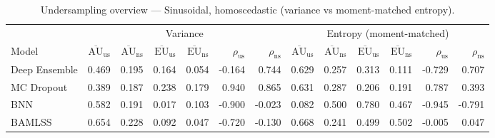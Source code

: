 \begin{table}[htbp]
\centering
\small
\caption{Undersampling overview --- Sinusoidal, homoscedastic (variance vs moment-matched entropy).}
\begin{tabular}{l*{12}{r}}
\toprule
 & \multicolumn{6}{c}{Variance} & \multicolumn{6}{c}{Entropy (moment-matched)} \\
\cmidrule(lr){2-7}\cmidrule(lr){8-13}
Model & $\overline{\mathrm{AU}}_{\mathrm{us}}$ & $\overline{\mathrm{AU}}_{\mathrm{ns}}$ & $\overline{\mathrm{EU}}_{\mathrm{us}}$ & $\overline{\mathrm{EU}}_{\mathrm{ns}}$ & $\rho_{\mathrm{us}}$ & $\rho_{\mathrm{ns}}$ & $\overline{\mathrm{AU}}_{\mathrm{us}}$ & $\overline{\mathrm{AU}}_{\mathrm{ns}}$ & $\overline{\mathrm{EU}}_{\mathrm{us}}$ & $\overline{\mathrm{EU}}_{\mathrm{ns}}$ & $\rho_{\mathrm{us}}$ & $\rho_{\mathrm{ns}}$ \\
\midrule
Deep Ensemble & 0.469 & 0.195 & 0.164 & 0.054 & -0.164 & 0.744 & 0.629 & 0.257 & 0.313 & 0.111 & -0.729 & 0.707 \\
MC Dropout & 0.389 & 0.187 & 0.238 & 0.179 & 0.940 & 0.865 & 0.631 & 0.287 & 0.206 & 0.191 & 0.787 & 0.393 \\
BNN & 0.582 & 0.191 & 0.017 & 0.103 & -0.900 & -0.023 & 0.082 & 0.500 & 0.780 & 0.467 & -0.945 & -0.791 \\
BAMLSS & 0.654 & 0.228 & 0.092 & 0.047 & -0.720 & -0.130 & 0.668 & 0.241 & 0.499 & 0.502 & -0.005 & 0.047 \\
\bottomrule
\end{tabular}
\end{table}
